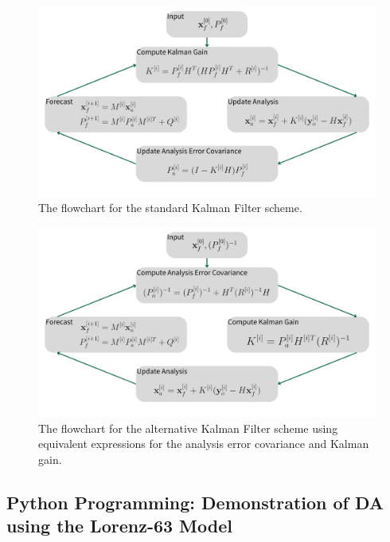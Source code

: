 \begin{landscape}
\begin{figure}
    \centering
    \includegraphics[width=0.99\linewidth]{graphics/Kalman1.png}
    \caption{The flowchart for the standard Kalman Filter scheme.}
    \label{fig:Kalmansteps}
\end{figure}
\end{landscape}
\begin{landscape}
\begin{figure}
    \centering
    \includegraphics[width=0.99\linewidth]{graphics/Kalman2.png}
    \caption{The flowchart for the alternative Kalman Filter scheme using equivalent expressions for the analysis error covariance and Kalman gain.}
    \label{fig:Kalmansteps2}
\end{figure}
\end{landscape}

\subsection{Python Programming: Demonstration of DA using the Lorenz-63 Model}
\label{subsection:DAsystem}

